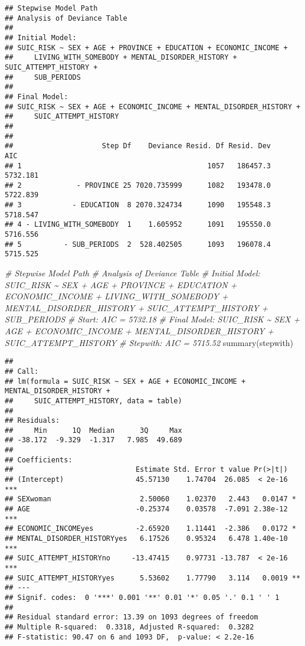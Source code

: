\documentclass[
]{book}
\newenvironment{Shaded}{\begin{snugshade}}{\end{snugshade}}
\newcommand{\CommentTok}[1]{\textcolor[rgb]{0.56,0.35,0.01}{\textit{#1}}}
\newcommand{\FunctionTok}[1]{\textcolor[rgb]{0.00,0.00,0.00}{#1}}
\newcommand{\NormalTok}[1]{#1}
\begin{document}
\begin{verbatim}
## Stepwise Model Path 
## Analysis of Deviance Table
## 
## Initial Model:
## SUIC_RISK ~ SEX + AGE + PROVINCE + EDUCATION + ECONOMIC_INCOME + 
##     LIVING_WITH_SOMEBODY + MENTAL_DISORDER_HISTORY + SUIC_ATTEMPT_HISTORY + 
##     SUB_PERIODS
## 
## Final Model:
## SUIC_RISK ~ SEX + AGE + ECONOMIC_INCOME + MENTAL_DISORDER_HISTORY + 
##     SUIC_ATTEMPT_HISTORY
## 
## 
##                     Step Df    Deviance Resid. Df Resid. Dev      AIC
## 1                                            1057   186457.3 5732.181
## 2             - PROVINCE 25 7020.735999      1082   193478.0 5722.839
## 3            - EDUCATION  8 2070.324734      1090   195548.3 5718.547
## 4 - LIVING_WITH_SOMEBODY  1    1.605952      1091   195550.0 5716.556
## 5          - SUB_PERIODS  2  528.402505      1093   196078.4 5715.525
\end{verbatim}

\begin{Shaded}
\begin{Highlighting}[]
\CommentTok{\# Stepwise Model Path }
\CommentTok{\# Analysis of Deviance Table}
\CommentTok{\# Initial Model: SUIC\_RISK \textasciitilde{} SEX + AGE + PROVINCE + EDUCATION + ECONOMIC\_INCOME + LIVING\_WITH\_SOMEBODY + MENTAL\_DISORDER\_HISTORY + SUIC\_ATTEMPT\_HISTORY + SUB\_PERIODS}
\CommentTok{\# Start:  AIC = 5732.18}
\CommentTok{\# Final Model: SUIC\_RISK \textasciitilde{} SEX + AGE + ECONOMIC\_INCOME + MENTAL\_DISORDER\_HISTORY + SUIC\_ATTEMPT\_HISTORY}
\CommentTok{\# Stepwith:  AIC = 5715.52}
\FunctionTok{summary}\NormalTok{(stepwith)}
\end{Highlighting}
\end{Shaded}

\begin{verbatim}
## 
## Call:
## lm(formula = SUIC_RISK ~ SEX + AGE + ECONOMIC_INCOME + MENTAL_DISORDER_HISTORY + 
##     SUIC_ATTEMPT_HISTORY, data = table)
## 
## Residuals:
##     Min      1Q  Median      3Q     Max 
## -38.172  -9.329  -1.317   7.985  49.689 
## 
## Coefficients:
##                             Estimate Std. Error t value Pr(>|t|)    
## (Intercept)                 45.57130    1.74704  26.085  < 2e-16 ***
## SEXwoman                     2.50060    1.02370   2.443   0.0147 *  
## AGE                         -0.25374    0.03578  -7.091 2.38e-12 ***
## ECONOMIC_INCOMEyes          -2.65920    1.11441  -2.386   0.0172 *  
## MENTAL_DISORDER_HISTORYyes   6.17526    0.95324   6.478 1.40e-10 ***
## SUIC_ATTEMPT_HISTORYno     -13.47415    0.97731 -13.787  < 2e-16 ***
## SUIC_ATTEMPT_HISTORYyes      5.53602    1.77790   3.114   0.0019 ** 
## ---
## Signif. codes:  0 '***' 0.001 '**' 0.01 '*' 0.05 '.' 0.1 ' ' 1
## 
## Residual standard error: 13.39 on 1093 degrees of freedom
## Multiple R-squared:  0.3318, Adjusted R-squared:  0.3282 
## F-statistic: 90.47 on 6 and 1093 DF,  p-value: < 2.2e-16
\end{verbatim}
\end{document}
